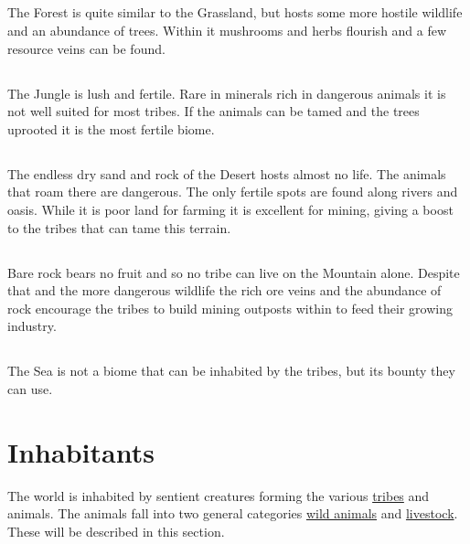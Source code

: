 \subsection{}\label{ch:World:Biomes:Forest}
The \gls*{Forest} is quite similar to the \gls{Grassland}, but hosts some more
hostile wildlife and an abundance of trees. Within it mushrooms and herbs
flourish and a few resource veins can be found.

\subsection{}\label{ch:World:Biomes:Jungle}
The \gls*{Jungle} is lush and fertile. Rare in minerals rich in dangerous
animals it is not well suited for most tribes. If the animals can be tamed and
the trees uprooted it is the most fertile biome.

\subsection{}\label{ch:World:Biomes:Desert}
The endless dry sand and rock of the \gls*{Desert} hosts almost no life. The
animals that roam there are dangerous. The only fertile spots are found along
rivers and oasis. While it is poor land for farming it is excellent for mining,
giving a boost to the tribes that can tame this terrain.

\subsection{}\label{ch:World:Biomes:Mountain}
Bare rock bears no fruit and so no tribe can live on the \gls*{Mountain} alone.
Despite that and the more dangerous wildlife the rich ore veins and the
abundance of rock encourage the tribes to build mining outposts within to feed
their growing industry.

\subsection{}\label{ch:World:Biomes:Sea}
The \gls*{Sea} is not a biome that can be inhabited by the tribes, but its
bounty they can use.

\printglossary[type=biome, title=Biome-Glossary]{}\label{ch:World:BiomesGlossary}

\section{Inhabitants}\label{ch:World:Inhabitants}
The world is inhabited by sentient creatures forming the various
\hyperref[ch:Tribes]{tribes} and animals. The animals fall into two general
categories \hyperref[ch:World:Inhabitants:Animals]{wild animals} and
\hyperref[ch:World:Inhbitants:Livestock]{livestock}. These will be described in
this section.

